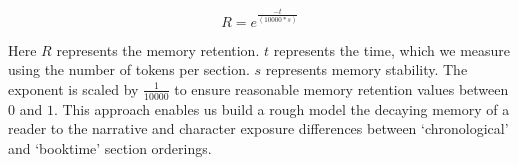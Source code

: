 \begin{equation}
    R = e^{\frac{-t}{(10000*s)}}
\end{equation}


Here $R$ represents the memory retention. $t$ represents the time, which we measure using the number of tokens per section. $s$ represents memory stability. The exponent is scaled by $\frac{1}{10000}$ to ensure reasonable memory retention values between $0$ and $1$. This approach enables us build a rough model the decaying memory of a reader to the narrative and character exposure differences between `chronological' and `booktime' section orderings.
